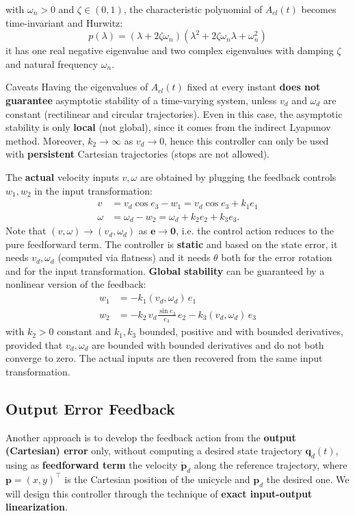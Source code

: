 \documentclass[10pt, a4paper]{report}
\newcommand{\q}{{\mathbf q}}
\begin{document}
with $\omega_n>0$ and $\zeta\in(0,1)$, the characteristic polynomial of $A_{cl}(t)$ becomes time-invariant and Hurwitz:\begin{equation}
    p(\lambda)=(\lambda+2\zeta \omega_n)(\lambda^2+2\zeta \omega_n\lambda+\omega_n^2)
\end{equation}
it has one real negative eigenvalue and two complex eigenvalues with damping $\zeta$ and natural frequency $\omega_n$.
\begin{boxobservation}{Caveats}{}
    Having the eigenvalues of $A_{cl}(t)$ fixed at every instant \textbf{does not guarantee} asymptotic stability of a time-varying system, unless $v_d$ and $\omega_d$ are constant (rectilinear and circular trajectories). Even in this case, the asymptotic stability is only \textbf{local} (not global), since it comes from the indirect Lyapunov method. Moreover, $k_2\to\infty$ as $v_d\to 0$, hence this controller can only be used with \textbf{persistent} Cartesian trajectories (stops are not allowed).
\end{boxobservation}
The \textbf{actual} velocity inputs $v,\omega$ are obtained by plugging the feedback controls $w_1,w_2$ in the input transformation:\begin{align}
    v&=v_d\cos e_3-w_1=v_d\cos e_3+k_1e_1\\
    \omega&=\omega_d-w_2=\omega_d+k_2e_2+k_3e_3.
\end{align}
Note that $(v,\omega)\to(v_d,\omega_d)$ as $\mathbf e\to\mathbf 0$, i.e. the control action reduces to the pure feedforward term. The controller is \textbf{static} and based on the state error, it needs $v_d,\omega_d$ (computed via flatness) and it needs $\theta$ both for the error rotation and for the input transformation.
\textbf{Global stability} can be guaranteed by a nonlinear version of the feedback:\begin{align}
    w_1&=-k_1(v_d,\omega_d)\,e_1\\
    w_2&=-k_2\,v_d\frac{\sin e_3}{e_3}\,e_2-k_3(v_d,\omega_d)\,e_3
\end{align}
with $k_2>0$ constant and $k_1,k_3$ bounded, positive and with bounded derivatives, provided that $v_d,\omega_d$ are bounded with bounded derivatives and do not both converge to zero. The actual inputs are then recovered from the same input transformation.
\subsection{Output Error Feedback}
Another approach is to develop the feedback action from the \textbf{output (Cartesian) error} only, without computing a desired state trajectory $\q_d(t)$, using as \textbf{feedforward term} the velocity $\dot{\mathbf p}_d$ along the reference trajectory, where $\mathbf p=(x,y)^\top$ is the Cartesian position of the unicycle and $\mathbf p_d$ the desired one.
We will design this controller through the technique of \textbf{exact input-output linearization}.
\end{document}
